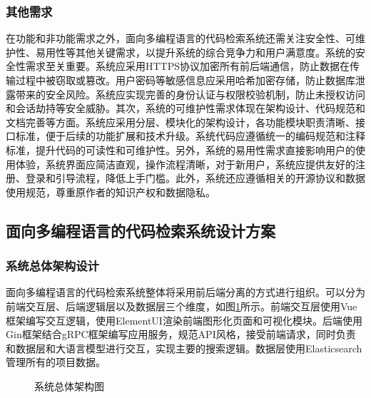 \documentclass[UTF8,a4paper,12pt]{ctexart}
\numberwithin{equation}{section}
\begin{document}
\subsubsection{其他需求}
在功能和非功能需求之外，面向多编程语言的代码检索系统还需关注安全性、可维护性、易用性等其他关键需求，以提升系统的综合竞争力和用户满意度。系统的安全性需求至关重要。系统应采用HTTPS协议加密所有前后端通信，防止数据在传输过程中被窃取或篡改。用户密码等敏感信息应采用哈希加密存储，防止数据库泄露带来的安全风险。系统应实现完善的身份认证与权限校验机制，防止未授权访问和会话劫持等安全威胁。其次，系统的可维护性需求体现在架构设计、代码规范和文档完善等方面。系统应采用分层、模块化的架构设计，各功能模块职责清晰、接口标准，便于后续的功能扩展和技术升级。系统代码应遵循统一的编码规范和注释标准，提升代码的可读性和可维护性。另外，系统的易用性需求直接影响用户的使用体验，系统界面应简洁直观，操作流程清晰，对于新用户，系统应提供友好的注册、登录和引导流程，降低上手门槛。此外，系统还应遵循相关的开源协议和数据使用规范，尊重原作者的知识产权和数据隐私。\par
\subsection{面向多编程语言的代码检索系统设计方案}
\subsubsection{系统总体架构设计}
面向多编程语言的代码检索系统整体将采用前后端分离的方式进行组织。可以分为前端交互层、后端逻辑层以及数据层三个维度，如图\ref{all_structure}所示。前端交互层使用Vue框架编写交互逻辑，使用ElementUI渲染前端图形化页面和可视化模块。后端使用Gin框架结合gRPC框架编写应用服务，规范API风格，接受前端请求，同时负责和数据层和大语言模型进行交互，实现主要的搜索逻辑。数据层使用Elasticsearch管理所有的项目数据。
\begin{figure}[H]
	\caption{系统总体架构图}
	\label{all_structure}
\end{figure}
\end{document}
